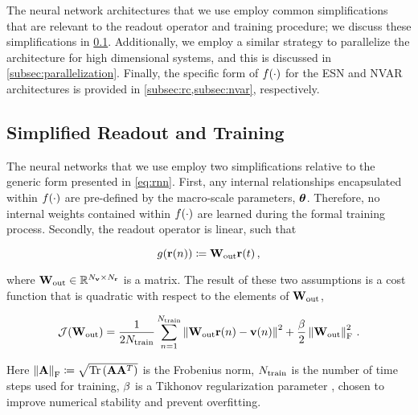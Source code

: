 The neural network architectures that we use employ common
simplifications that are relevant to the readout operator and training
procedure; we discuss these simplifications in \cref{subsec:readout}.
Additionally, we employ a similar strategy to parallelize the architecture for
high dimensional systems, and this is discussed in
\cref{subsec:parallelization}.
Finally, the specific form of $f(\cdot)$ for the ESN and NVAR architectures
is provided in \cref{subsec:rc,subsec:nvar},
respectively.


\subsection{Simplified Readout and Training}
\label{subsec:readout}

The neural networks that we use employ two
simplifications relative to the generic form presented in
\cref{eq:rnn}.
First, any internal relationships encapsulated within
$f(\cdot)$ are pre-defined by the macro-scale parameters,
$\bm{\theta}$.
Therefore, no internal weights contained within $f(\cdot)$
are learned during the formal training process.
Secondly, the readout operator is linear, such that
\begin{linenomath*}\begin{equation*}
    g(\mathbf{r}(n)) \coloneqq \mathbf{W}_\text{out} \mathbf{r}(t) \, ,
\end{equation*}\end{linenomath*}
where $\mathbf{W}_\text{out} \in \mathbb{R}^{N_{\mathbf{v}}\times N_{\mathbf{r}}}$ is a matrix.
The result of these two assumptions is a cost function that is quadratic with
respect to the elements of $\mathbf{W}_\text{out}$,
\begin{linenomath*}\begin{equation}
    \mathcal{J}(\mathbf{W}_\text{out}) =
        \dfrac{1}{2N_\text{train}}\sum_{n=1}^{N_\text{train}}
        \left\lVert\mathbf{W}_\text{out} \mathbf{r}(n) - \mathbf{v}(n)\right\rVert^2
        +
        \dfrac{\beta}{2}\left\lVert\mathbf{W}_\text{out}\right\rVert_\text{F}^2 \, .
    \label{eq:cost}
\end{equation}\end{linenomath*}
Here
$\left\lVert\mathbf{A}\right\rVert_\text{F} \coloneqq
\sqrt{\text{Tr}\left(\mathbf{A}\mathbf{A}^T\right)}$
is the Frobenius norm,
$N_\text{train}$ is the number of time steps used for training,
$\beta$ is a Tikhonov regularization parameter \citep{tikhonov_solution_1963}, chosen to improve
numerical stability and prevent overfitting.

